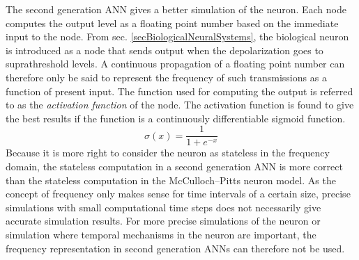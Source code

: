 	The second generation ANN gives a better simulation of the neuron. %
	Each node computes the output level as a floating point number based on the immediate input to the node.
	From sec. \ref{secBiologicalNeuralSystems}, the biological neuron is introduced as a node that sends output when the depolarization goes to suprathreshold levels.
	A continuous propagation of a floating point number can therefore only be said to represent the frequency of such transmissions as a function of present input.
	The function used for computing the output is referred to as the \emph{activation function} of the node.
	The activation function is found to give the best results if the function is a continuously differentiable sigmoid function\cite{HaykinANNbok}.
	\begin{equation}
		\sigma(x)=\frac{1}{1+e^{-x}}   %
	\end{equation}
	Because it is more right to consider the neuron as stateless in the frequency domain, the stateless computation in a second generation ANN is more correct than the stateless computation in the McCulloch--Pitts neuron model.
	As the concept of frequency only makes sense for time intervals of a certain size, precise simulations with small computational time steps does not necessarily give accurate simulation results.
	For more precise simulations of the neuron or simulation where temporal mechanisms in the neuron are important, the frequency representation in second generation ANNs can therefore not be used.  %


